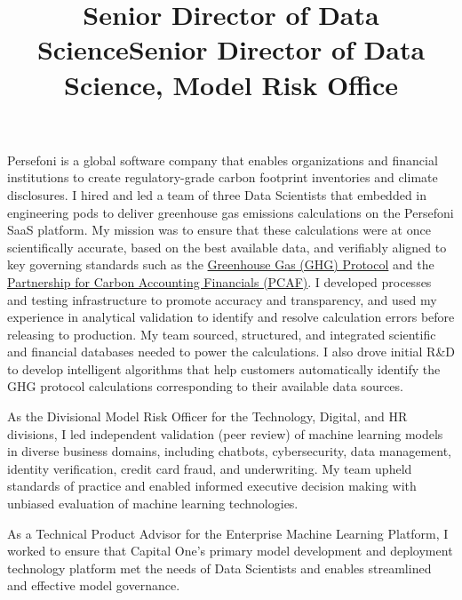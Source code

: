 \begin{resume}
\title{Senior Director of Data Science}
\begin{position}
Persefoni is a global software company that enables organizations and financial institutions to create regulatory-grade carbon footprint inventories and climate disclosures.  I hired and led a team of three Data Scientists that embedded in engineering pods to deliver greenhouse gas emissions calculations on the Persefoni SaaS platform.  My mission was to ensure that these calculations were at once scientifically accurate, based on the best available data, and verifiably aligned to key governing standards such as the \href{https://ghgprotocol.org/}{Greenhouse Gas (GHG) Protocol} and the \href{https://carbonaccountingfinancials.com/}{Partnership for Carbon Accounting Financials (PCAF)}. I developed processes and testing infrastructure to promote accuracy and transparency, and used my experience in analytical validation to identify and resolve calculation errors before releasing to production.  My team sourced, structured, and integrated scientific and financial databases needed to power the calculations. I also drove initial R\&D to develop intelligent algorithms that help customers automatically identify the GHG protocol calculations corresponding to their available data sources.  
\end{position}


\title{Senior Director of Data Science, Model Risk Office}
\begin{position}
As the Divisional Model Risk Officer for the Technology, Digital, and HR divisions, I led independent validation (peer review)
of machine learning models in diverse business domains, including chatbots, cybersecurity, data management, identity verification, credit card fraud, and underwriting. My team upheld standards of practice and enabled informed executive decision making with unbiased evaluation of machine learning technologies.

As a Technical Product Advisor for the Enterprise Machine Learning Platform, I worked to ensure that Capital One's primary model development and
deployment technology platform met the needs of Data Scientists and enables streamlined and effective model governance.
\end{position}


\end{resume}
